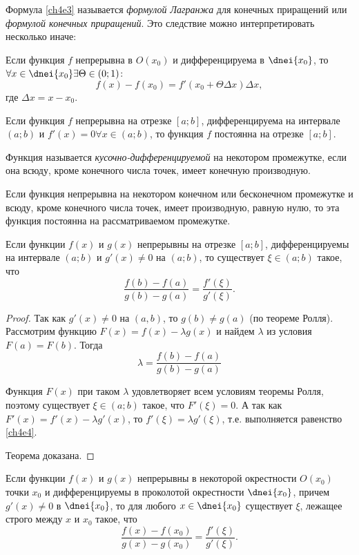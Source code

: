 Формула \eqref{ch4e3} называется \textit{формулой Лагранжа} для конечных приращений или \textit{формулой конечных приращений}.
Это следствие можно интерпретировать несколько иначе:

\begin{cons}
Если функция $f$ непрерывна в $O(x_0)$ и дифференцируема в $\dnei{x_0}$, то $\forall x \in \dnei{x_0} \exists \Theta \in (0;1)$:
$$
f(x) - f(x_0) = f'(x_0 + \Theta\Delta x)\Delta x,
$$
где $\Delta x=x-x_0$.
\end{cons}

\begin{cons}
Если функция $f$ непрерывна на отрезке $[a; b]$, дифференцируема на интервале $(a;b)$ и $f'(x) = 0 \forall x \in (a;b)$, то функция $f$ постоянна на отрезке $[a; b]$.	
\end{cons}

\begin{defn}Функция называется \textit{кусочно-дифференцируемой} на некотором промежутке, если она всюду, кроме конечного числа точек, имеет конечную производную.
\end{defn}

\begin{cons} Если функция непрерывна на некотором конечном или бесконечном промежутке и всюду, кроме конечного числа точек, имеет производную, равную нулю, то эта функция постоянна на рассматриваемом промежутке.
\end{cons}

\begin{thm}  Если функции $f(x)$ и $g(x)$ непрерывны на отрезке $[a; b]$, дифференцируемы на интервале $(a; b)$ и $g'(x) \ne 0$ на $(a; b)$, то существует $\xi \in (a; b)$ такое, что
\begin{equation}
\label{ch4e4}
\frac{f(b)-f(a)}{g(b)-g(a)}=\frac{f'(\xi)}{g'(\xi)}.
\end{equation}
\end{thm}

\begin{proof} Так как $g'(x) \ne 0$ на $(a,b)$, то $g(b)\ne g(a)$ (по теореме Ролля). Рассмотрим функцию $F(x) =f(x) - \lambda g(x)$ и найдем $\lambda$ из условия $F(a) = F(b)$. Тогда
$$
\lambda = \frac{f(b)-f(a)}{g(b)-g(a)}
$$

Функция $F(x)$ при таком $\lambda$ удовлетворяет всем условиям теоремы Ролля, поэтому существует $\xi \in (a; b)$ такое, что $F'(\xi) = 0$. А так как $F'(x) = f'(x) - \lambda g'(x)$, то $f'(\xi) = \lambda g'(\xi)$, т.е. выполняется равенство \eqref{ch4e4}.

Теорема доказана.
\end{proof}

\begin{cons} \label{ch4.1cons5}
	Если функции $f(x)$ и $g(x)$ непрерывны в некоторой окрестности $O(x_0)$ точки $x_0$ и дифференцируемы в проколотой
окрестности $\dnei{x_0}$, причем $g'(x) \ne 0$ в  $\dnei{x_0}$, то  для любого $x \in  \dnei{x_0}$ существует $\xi$, лежащее строго между $x$ и $x_0$ такое, что
$$
\frac{f(x)-f(x_0)}{g(x)-g(x_0)}=\frac{f'(\xi)}{g'(\xi)}.
$$
\end{cons}